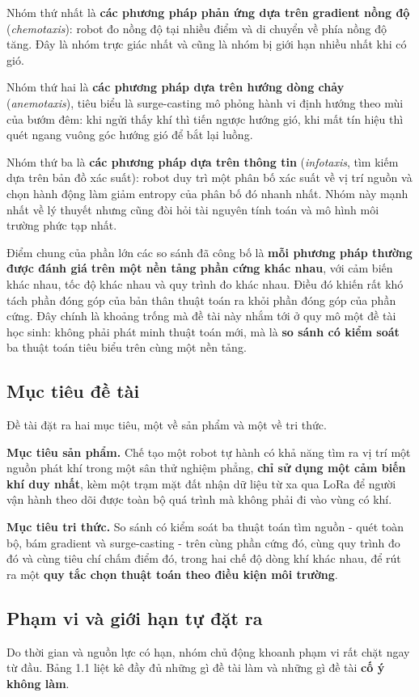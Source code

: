 Nhóm thứ nhất là \textbf{các phương pháp phản ứng dựa trên gradient nồng độ} (\textit{chemotaxis}): robot đo nồng độ tại nhiều điểm và di chuyển về phía nồng độ tăng. Đây là nhóm trực giác nhất và cũng là nhóm bị giới hạn nhiều nhất khi có gió.

Nhóm thứ hai là \textbf{các phương pháp dựa trên hướng dòng chảy} (\textit{anemotaxis}), tiêu biểu là surge-casting mô phỏng hành vi định hướng theo mùi của bướm đêm: khi ngửi thấy khí thì tiến ngược hướng gió, khi mất tín hiệu thì quét ngang vuông góc hướng gió để bắt lại luồng.

Nhóm thứ ba là \textbf{các phương pháp dựa trên thông tin} (\textit{infotaxis}, tìm kiếm dựa trên bản đồ xác suất): robot duy trì một phân bố xác suất về vị trí nguồn và chọn hành động làm giảm entropy của phân bố đó nhanh nhất. Nhóm này mạnh nhất về lý thuyết nhưng cũng đòi hỏi tài nguyên tính toán và mô hình môi trường phức tạp nhất.

Điểm chung của phần lớn các so sánh đã công bố là \textbf{mỗi phương pháp thường được đánh giá trên một nền tảng phần cứng khác nhau}, với cảm biến khác nhau, tốc độ khác nhau và quy trình đo khác nhau. Điều đó khiến rất khó tách phần đóng góp của bản thân thuật toán ra khỏi phần đóng góp của phần cứng. Đây chính là khoảng trống mà đề tài này nhắm tới ở quy mô một đề tài học sinh: không phải phát minh thuật toán mới, mà là \textbf{so sánh có kiểm soát} ba thuật toán tiêu biểu trên cùng một nền tảng.


\subsection{Mục tiêu đề tài}
Đề tài đặt ra hai mục tiêu, một về sản phẩm và một về tri thức.

\textbf{Mục tiêu sản phẩm.} Chế tạo một robot tự hành có khả năng tìm ra vị trí một nguồn phát khí trong một sân thử nghiệm phẳng, \textbf{chỉ sử dụng một cảm biến khí duy nhất}, kèm một trạm mặt đất nhận dữ liệu từ xa qua LoRa để người vận hành theo dõi được toàn bộ quá trình mà không phải đi vào vùng có khí.

\textbf{Mục tiêu tri thức.} So sánh có kiểm soát ba thuật toán tìm nguồn - quét toàn bộ, bám gradient và surge-casting - trên cùng phần cứng đó, cùng quy trình đo đó và cùng tiêu chí chấm điểm đó, trong hai chế độ dòng khí khác nhau, để rút ra một \textbf{quy tắc chọn thuật toán theo điều kiện môi trường}.


\subsection{Phạm vi và giới hạn tự đặt ra}
Do thời gian và nguồn lực có hạn, nhóm chủ động khoanh phạm vi rất chặt ngay từ đầu. Bảng 1.1 liệt kê đầy đủ những gì đề tài làm và những gì đề tài \textbf{cố ý không làm}.

